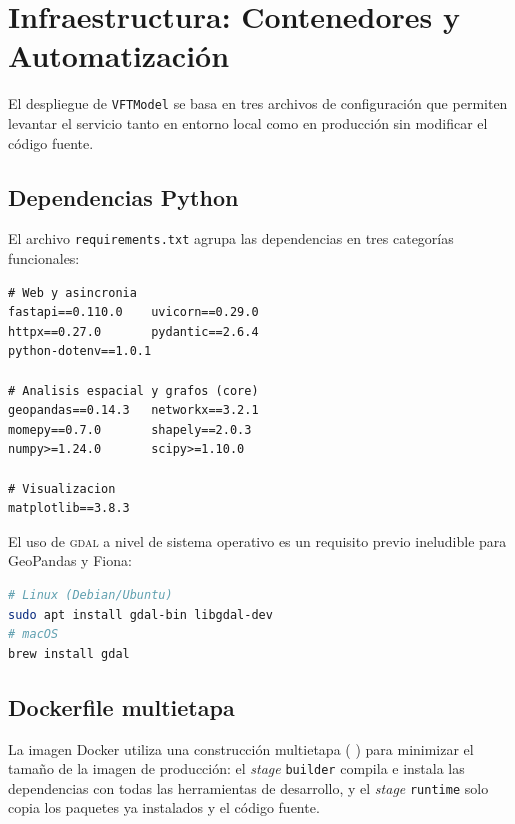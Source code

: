 
\section{Infraestructura: Contenedores y Automatización}
\label{anx:vft-infraestructura}

El despliegue de \texttt{VFTModel} se basa en tres archivos de configuración que permiten
levantar el servicio tanto en entorno local como en producción sin modificar el
código fuente.

\subsection*{Dependencias Python}

El archivo \texttt{requirements.txt} agrupa las dependencias en tres categorías
funcionales:

\begin{lstlisting}[style=estiloPython,
    caption={Dependencias de VFTModel (\texttt{requirements.txt}).},
    label=lst:vft-requirements]
# Web y asincronia
fastapi==0.110.0    uvicorn==0.29.0
httpx==0.27.0       pydantic==2.6.4
python-dotenv==1.0.1

# Analisis espacial y grafos (core)
geopandas==0.14.3   networkx==3.2.1
momepy==0.7.0       shapely==2.0.3
numpy>=1.24.0       scipy>=1.10.0

# Visualizacion
matplotlib==3.8.3
\end{lstlisting}

El uso de \textsc{gdal} a nivel de sistema operativo es un requisito previo
ineludible para GeoPandas y Fiona:

\begin{lstlisting}[language=bash,
    caption={Instalación de GDAL a nivel de sistema operativo.},
    label=lst:vft-gdal]
# Linux (Debian/Ubuntu)
sudo apt install gdal-bin libgdal-dev
# macOS
brew install gdal
\end{lstlisting}

\subsection*{Dockerfile multietapa}

La imagen Docker utiliza una construcción multietapa (
) para minimizar el tamaño de la imagen de
producción: el \textit{stage} \texttt{builder} compila e instala las
dependencias con todas las herramientas de desarrollo, y el \textit{stage}
\texttt{runtime} solo copia los paquetes ya instalados y el código fuente.

